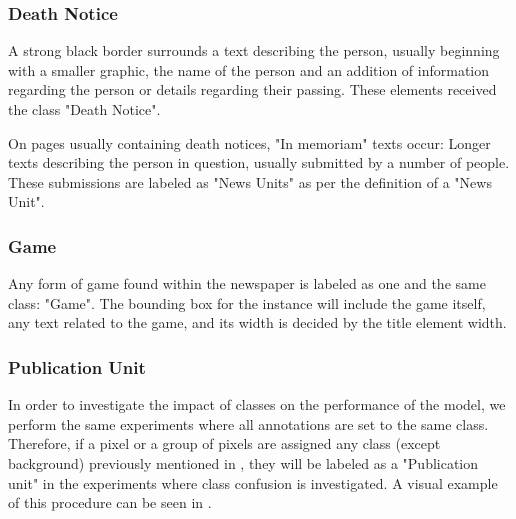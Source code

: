 \documentclass[oneside, english, bibtex]{kththesis}
\begin{document}
\subsubsection{Death Notice}

A strong black border surrounds a text describing the person, usually beginning with a smaller graphic,
the name of the person and an addition of information regarding the person or details regarding their passing. These elements received the class "Death Notice".

On pages usually containing death notices, "In memoriam" texts occur: Longer texts describing the person in question, usually submitted by a number of people.
These submissions are labeled as "News Units" as per the definition of a "News Unit".

\subsubsection{Game}
\label{subsub:labelgame}

Any form of game found within the newspaper is labeled as one and the same class: "Game".
The bounding box for the instance will include the game itself, any text related to the game, and its width is decided by the title element width.


\subsubsection{Publication Unit}
\label{subs:pubunit}

In order to investigate the impact of classes on the performance of the model, we perform the same experiments where all annotations are set to the same class.
Therefore, if a pixel or a group of pixels are assigned any class (except background) previously mentioned in , they will be labeled as a "Publication unit" in the experiments where class confusion is investigated.
A visual example of this procedure can be seen in .
\end{document}
